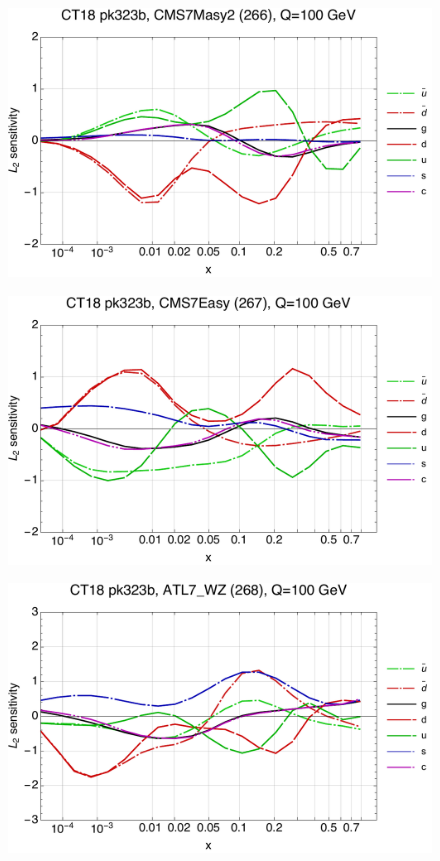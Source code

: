 \documentclass[10pt,aps,prd,floatfix,titlepage]{revtex4}
\begin{document}
\begin{figure}
\includegraphics[width=\textwidth,height=0.44\textheight,keepaspectratio]{1/266_ct18nn_L2_q100_Sf_1.pdf}
\caption{}
\end{figure}
\clearpage
\begin{figure}
\includegraphics[width=\textwidth,height=0.44\textheight,keepaspectratio]{1/267_ct18nn_L2_q100_Sf_1.pdf}
\caption{}
\end{figure}
\begin{figure}
\includegraphics[width=\textwidth,height=0.44\textheight,keepaspectratio]{1/268_ct18nn_L2_q100_Sf_1.pdf}
\caption{}
\end{figure}
\end{document}
